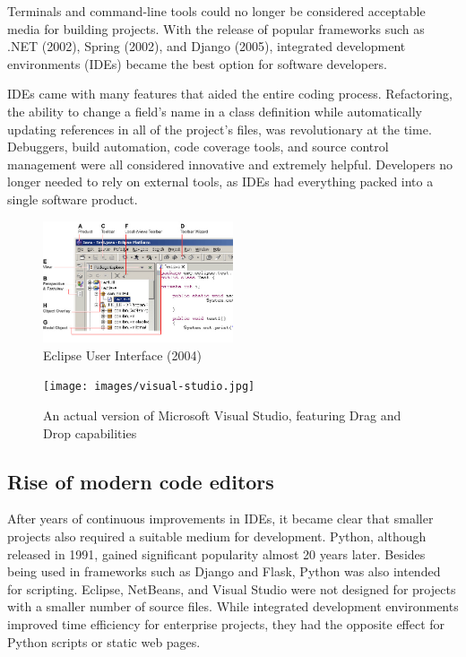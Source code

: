 Terminals and command-line tools could no longer be considered acceptable media for building projects. With the release of popular frameworks such as .NET (2002), Spring (2002), and Django (2005), integrated development environments (IDEs) became the best option for software developers.

IDEs came with many features that aided the entire coding process. Refactoring, the ability to change a field's name in a class definition while automatically updating references in all of the project's files, was revolutionary at the time. Debuggers, build automation, code coverage tools, and source control management were all considered innovative and extremely helpful. Developers no longer needed to rely on external tools, as IDEs had everything packed into a single software product.

\begin{figure}[h]
\centering
\includegraphics[width=0.5\textwidth]{images/eclipse.jpg}
\caption{Eclipse User Interface (2004)}
\label{fig:fig2,1.}
\end{figure}

\begin{figure}[h]
\centering
\texttt{[image: images/visual-studio.jpg]}
\caption{An actual version of Microsoft Visual Studio, featuring Drag and Drop capabilities}
\label{fig:fig2,1.}
\end{figure}

\subsection{Rise of modern code editors}

After years of continuous improvements in IDEs, it became clear that smaller projects also required a suitable medium for development. Python, although released in 1991, gained significant popularity almost 20 years later. Besides being used in frameworks such as Django and Flask, Python was also intended for scripting. Eclipse, NetBeans, and Visual Studio were not designed for projects with a smaller number of source files. While integrated development environments improved time efficiency for enterprise projects, they had the opposite effect for Python scripts or static web pages.

